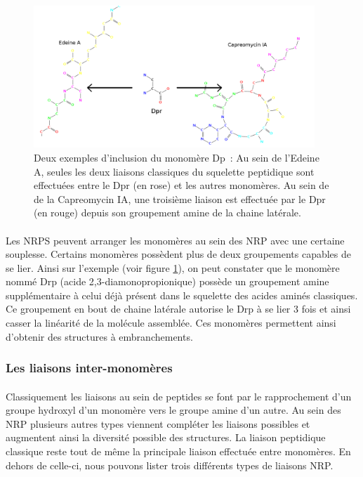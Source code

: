 \documentclass[12pt,french,twoside]{report}
\begin{document}
\begin{figure}[h!]
  \begin{center}
    \includegraphics[width=400px]{Figures/bio/Intro/Dpr/2-3_liaisons.png}
    \caption{\label{DPR_incl}Deux exemples d'inclusion du monomère Dp~:
    Au sein de l'Edeine A, seules les deux liaisons classiques du squelette peptidique sont effectuées entre le Dpr (en rose) et les autres monomères.
    Au sein de de la Capreomycin IA, une troisième liaison est effectuée par le Dpr (en rouge) depuis son groupement amine de la chaine latérale.}
  \end{center}
\end{figure}

\paragraph{}Les NRPS peuvent arranger les monomères au sein des NRP avec une certaine souplesse.
Certains monomères possèdent plus de deux groupements capables de se lier.
Ainsi sur l'exemple (voir figure \ref{DPR_incl}), on peut constater que le monomère nommé Drp (acide 2,3-diamonopropionique) possède un groupement amine supplémentaire à celui déjà présent dans le squelette des acides aminés classiques.
Ce groupement en bout de chaine latérale autorise le Drp à se lier 3 fois et ainsi casser la linéarité de la molécule assemblée.
Ces monomères permettent ainsi d'obtenir des structures à embranchements.


\subsubsection{Les liaisons inter-monomères}

\paragraph{}Classiquement les liaisons au sein de peptides se font par le rapprochement d'un groupe hydroxyl d'un monomère vers le groupe amine d'un autre.
Au sein des NRP plusieurs autres types viennent compléter les liaisons possibles et augmentent ainsi la diversité possible des structures.
La liaison peptidique classique reste tout de même la principale liaison effectuée entre monomères.
En dehors de celle-ci, nous pouvons lister trois différents types de liaisons NRP.
\end{document}
